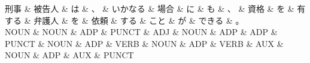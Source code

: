 \documentclass[tikz,border=5pt]{standalone}
\begin{document}
\normalsize
\begin{dependency}[edge unit distance=12.0pt]
    \begin{deptext}[column sep=1em]
        刑事 \& 被告人 \& は \& 、 \& いかなる \& 場合 \& に \& も \& 、 \& 資格 \& を \& 有する \& 弁護人 \& を \& 依頼 \& する \& こと \& が \& できる \& 。\\
        NOUN \& NOUN \& ADP \& PUNCT \& ADJ \& NOUN \& ADP \& ADP \& PUNCT \& NOUN \& ADP \& VERB \& NOUN \& ADP \& VERB \& AUX \& NOUN \& ADP \& AUX \& PUNCT\\
    \end{deptext}
\end{dependency}
\end{document}
